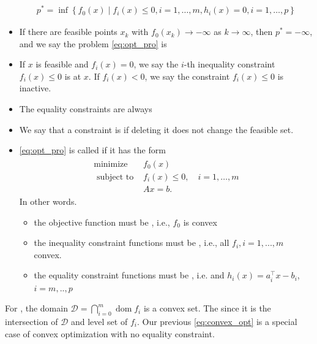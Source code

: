 \documentclass{article}
\begin{document}
\begin{defa}
\begin{itemize}
\begin{align*}
p^* =\inf \left\{f_{0}(x) \mid f_{i}(x) \leq 0, i=1, \ldots, m, h_{i}(x)=0, i=1, \ldots, p\right\}
\end{align*}
    \item If there are feasible points $x_{k}$ with $f_{0}\left(x_{k}\right) \rightarrow-\infty$ as $k \rightarrow \infty$, then $p^* =-\infty$, and we say the problem \cref{eq:opt_pro} is 
    \item If $x$ is feasible and $f_{i}(x)=0$, we say the $i$-th inequality constraint $f_{i}(x) \leq 0$ is  at $x$. If $f_{i}(x)<0$, we say the constraint $f_{i}(x) \leq 0$ is inactive. 
    \item The equality constraints are always 
    \item We say that a constraint is  if deleting it does not change the feasible set.
    \item \cref{eq:opt_pro} is called   if it has the form
    \begin{align}
\begin{array}{ll}
\operatorname{minimize} & f_{0}(x) \\
\text { subject to } & f_{i}(x) \leq 0, \quad i=1, \ldots, m \\
& A x=b.
\end{array}
\end{align} In other words.
    \begin{itemize}
        \item the objective function must be , i.e., $f_0$ is convex
        \item the inequality constraint functions must be , i.e.,  all $f_i,i=1,...,m$  convex.
        \item the equality constraint functions must be , i.e. and $h_{i}(x)=a_{i}^{\top} x-b_{i}$, $i=m,..,p$
    \end{itemize} 
\end{itemize}
\end{defa}
\begin{rema}
 For , the domain $\mathcal{D}=\bigcap_{i=0}^{m} \operatorname{dom} f_{i}$  is a convex set. The  since it is the intersection of $\mathcal{D}$ and level set of $f_i$. Our previous \cref{eq:convex_opt} is a special case of convex optimization with no equality constraint.
\end{rema}
\end{document}
